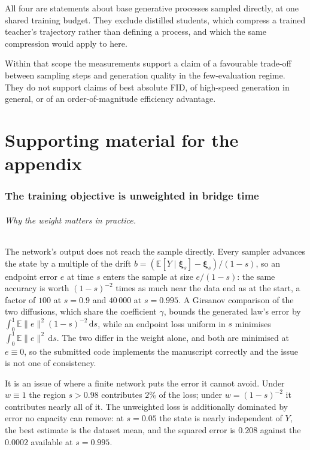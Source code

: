 \documentclass[11pt,a4paper]{article}
\def\E{\mathbb{E}}
\def\d{\mathrm{d}}
\def\xib{\boldsymbol{\xi}}
\begin{document}
All four are statements about base generative processes sampled directly, at one
shared training budget. They exclude distilled students, which compress a trained
teacher's trajectory rather than defining a process, and which the same
compression would apply to here.

Within that scope the measurements support a claim of a favourable trade-off
between sampling steps and generation quality in the few-evaluation regime. They
do not support claims of best absolute FID, of high-speed generation in general,
or of an order-of-magnitude efficiency advantage.

\part{Supporting material for the appendix}
\label{part:app}

\section{The training objective is unweighted in bridge time}
\label{app:weighting}

\paragraph{Why the weight matters in practice.} The network's output does not
reach the sample directly. Every sampler advances the state by a multiple of the
drift $b=(\E[Y\mid\xib_s]-\xib_s)/(1-s)$, so an endpoint error $e$ at time $s$
enters the sample at size $e/(1-s)$: the same accuracy is worth $(1-s)^{-2}$
times as much near the data end as at the start, a factor of $100$ at $s=0.9$
and $40\,000$ at $s=0.995$. A Girsanov comparison of the two diffusions, which
share the coefficient $\gamma$, bounds the generated law's error by
$\int_0^1\E\|e\|^2(1-s)^{-2}\,\d s$, while an endpoint loss uniform in $s$
minimises $\int_0^1\E\|e\|^2\,\d s$. The two differ in the weight alone, and both
are minimised at $e\equiv0$, so the submitted code implements the manuscript
correctly and the issue is not one of consistency.

It is an issue of where a finite network puts the error it cannot avoid. Under
$w\equiv1$ the region $s>0.98$ contributes $2\%$ of the loss; under
$w=(1-s)^{-2}$ it contributes nearly all of it. The unweighted loss is
additionally dominated by error no capacity can remove: at $s=0.05$ the state is
nearly independent of $Y$, the best estimate is the dataset mean, and the squared
error is $0.208$ against the $0.0002$ available at $s=0.995$.
\end{document}
